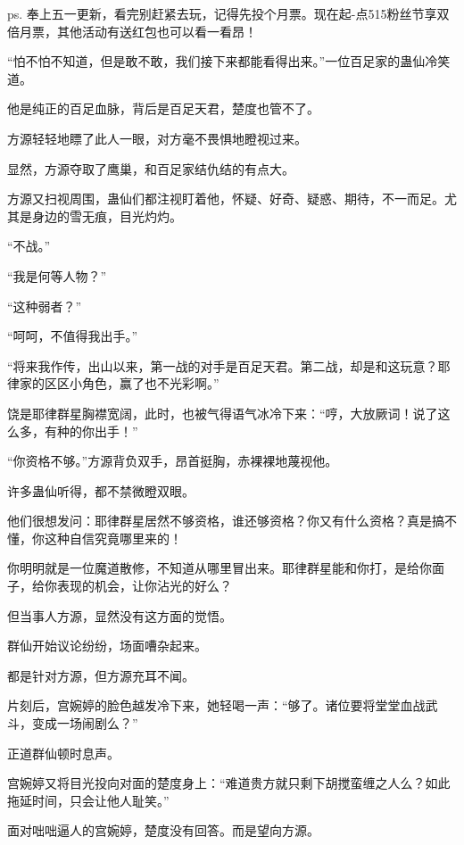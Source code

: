 
\begin{this_body}



ps. 奉上五一更新，看完别赶紧去玩，记得先投个月票。现在起-点515粉丝节享双倍月票，其他活动有送红包也可以看一看昂！

“怕不怕不知道，但是敢不敢，我们接下来都能看得出来。”一位百足家的蛊仙冷笑道。

他是纯正的百足血脉，背后是百足天君，楚度也管不了。

方源轻轻地瞟了此人一眼，对方毫不畏惧地瞪视过来。

显然，方源夺取了鹰巢，和百足家结仇结的有点大。

方源又扫视周围，蛊仙们都注视盯着他，怀疑、好奇、疑惑、期待，不一而足。尤其是身边的雪无痕，目光灼灼。

“不战。”

“我是何等人物？”

“这种弱者？”

“呵呵，不值得我出手。”

“将来我作传，出山以来，第一战的对手是百足天君。第二战，却是和这玩意？耶律家的区区小角色，赢了也不光彩啊。”

饶是耶律群星胸襟宽阔，此时，也被气得语气冰冷下来：“哼，大放厥词！说了这么多，有种的你出手！”

“你资格不够。”方源背负双手，昂首挺胸，赤裸裸地蔑视他。

许多蛊仙听得，都不禁微瞪双眼。

他们很想发问：耶律群星居然不够资格，谁还够资格？你又有什么资格？真是搞不懂，你这种自信究竟哪里来的！

你明明就是一位魔道散修，不知道从哪里冒出来。耶律群星能和你打，是给你面子，给你表现的机会，让你沾光的好么？

但当事人方源，显然没有这方面的觉悟。

群仙开始议论纷纷，场面嘈杂起来。

都是针对方源，但方源充耳不闻。

片刻后，宫婉婷的脸色越发冷下来，她轻喝一声：“够了。诸位要将堂堂血战武斗，变成一场闹剧么？”

正道群仙顿时息声。

宫婉婷又将目光投向对面的楚度身上：“难道贵方就只剩下胡搅蛮缠之人么？如此拖延时间，只会让他人耻笑。”

面对咄咄逼人的宫婉婷，楚度没有回答。而是望向方源。


\end{this_body}
